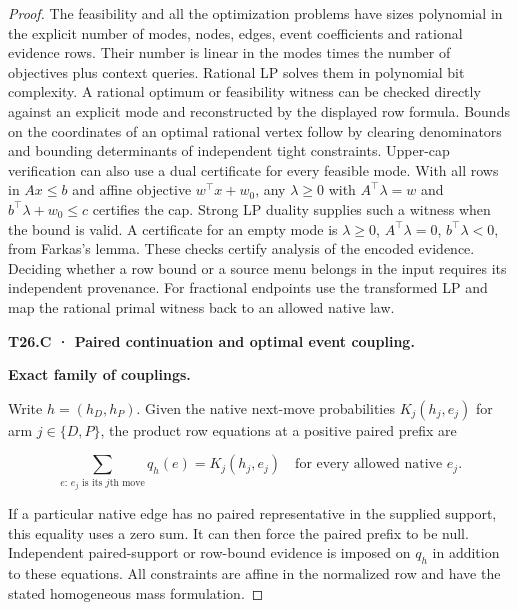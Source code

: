 \begin{proof}
The feasibility and all the optimization problems have sizes polynomial in the explicit number of modes, nodes, edges, event coefficients and rational evidence rows. Their number is linear in the modes times the number of objectives plus context queries. Rational LP solves them in polynomial bit complexity. A rational optimum or feasibility witness can be checked directly against an explicit mode and reconstructed by the displayed row formula. Bounds on the coordinates of an optimal rational vertex follow by clearing denominators and bounding determinants of independent tight constraints. Upper-cap verification can also use a dual certificate for every feasible mode. With all rows in \(A x\le b\) and affine objective \(w^\top x+w_0\), any \(\lambda\ge0\) with \(A^\top\lambda=w\) and \(b^\top\lambda+w_0\le c\) certifies the cap. Strong LP duality supplies such a witness when the bound is valid. A certificate for an empty mode is \(\lambda\ge0\), \(A^\top\lambda=0\), \(b^\top\lambda<0\), from Farkas's lemma. These checks certify analysis of the encoded evidence. Deciding whether a row bound or a source menu belongs in the input requires its independent provenance. For fractional endpoints use the transformed LP and map the rational primal witness back to an allowed native law.

\textbf{T26.C · Paired continuation and optimal event coupling.}

\textbf{Exact family of couplings.}

Write \(h=(h_D,h_P)\). Given the native next-move probabilities \(K_j(h_j,e_j)\) for arm \(j\in\{D,P\}\), the product row equations at a positive paired prefix are

\[
\sum_{e:\,e_j\text{ is its }j\text{th move}}q_h(e)=K_j(h_j,e_j)
\quad\text{for every allowed native }e_j.
\]

If a particular native edge has no paired representative in the supplied support, this equality uses a zero sum. It can then force the paired prefix to be null. Independent paired-support or row-bound evidence is imposed on \(q_h\) in addition to these equations. All constraints are affine in the normalized row and have the stated homogeneous mass formulation.


\end{proof}
